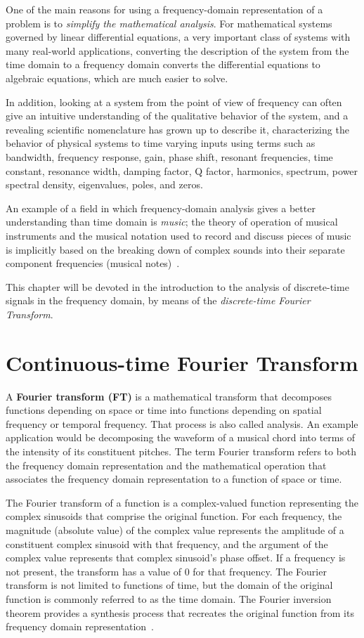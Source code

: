 \documentclass[\documentfontsize, twocolumn]{\classname}
\begin{document}
One of the main reasons for using a frequency-domain representation of a problem is to \emph{simplify the mathematical analysis}. For mathematical systems governed by linear differential equations, a very important class of systems with many real-world applications, converting the description of the system from the time domain to a frequency domain converts the differential equations to algebraic equations, which are much easier to solve.

In addition, looking at a system from the point of view of frequency can often give an intuitive understanding of the qualitative behavior of the system, and a revealing scientific nomenclature has grown up to describe it, characterizing the behavior of physical systems to time varying inputs using terms such as bandwidth, frequency response, gain, phase shift, resonant frequencies, time constant, resonance width, damping factor, Q factor, harmonics, spectrum, power spectral density, eigenvalues, poles, and zeros.

An example of a field in which frequency-domain analysis gives a better understanding than time domain is \emph{music}; the theory of operation of musical instruments and the musical notation used to record and discuss pieces of music is implicitly based on the breaking down of complex sounds into their separate component frequencies (musical notes)~\cite{bib:frequencyDomain}.

This chapter will be devoted in the introduction to the analysis of discrete-time signals in the frequency domain, by means of the \emph{discrete-time Fourier Transform}.


\section{Continuous-time Fourier Transform}

A \textbf{Fourier transform (FT)} is a mathematical transform that decomposes functions depending on space or time into functions depending on spatial frequency or temporal frequency. That process is also called analysis. An example application would be decomposing the waveform of a musical chord into terms of the intensity of its constituent pitches. The term Fourier transform refers to both the frequency domain representation and the mathematical operation that associates the frequency domain representation to a function of space or time.

The Fourier transform of a function is a complex-valued function representing the complex sinusoids that comprise the original function. For each frequency, the magnitude (absolute value) of the complex value represents the amplitude of a constituent complex sinusoid with that frequency, and the argument of the complex value represents that complex sinusoid's phase offset. If a frequency is not present, the transform has a value of 0 for that frequency. The Fourier transform is not limited to functions of time, but the domain of the original function is commonly referred to as the time domain. The Fourier inversion theorem provides a synthesis process that recreates the original function from its frequency domain representation~\cite{bib:fourierTransform}.
\end{document}
